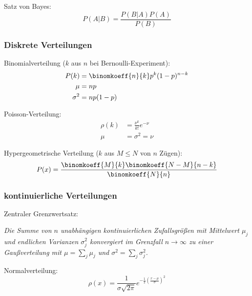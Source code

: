 \documentclass[11pt]{article}
\numberwithin{equation}{section}
\begin{document}
        Satz von Bayes:
        \begin{equation}
          P(A|B) = \frac{P(B|A)P(A)}{P(B)}
        \end{equation}

      \subsubsection{Diskrete Verteilungen}
        Binomialverteilung ($k$ aus $n$ bei Bernoulli-Experiment):
        \begin{equation}
          \begin{aligned}
            P(k)&=\binomkoeff{n}{k}p^k(1-p)^{n-k} \\
            \mu &= np \\
            \sigma^2 &= np(1-p)
          \end{aligned}
        \end{equation}

        Poisson-Verteilung:
        \begin{equation}
          \begin{aligned}
            \rho(k) &= \frac{\nu^k}{k!} e^{-\nu} \\
            \mu &= \sigma^2 = \nu
          \end{aligned}
        \end{equation}

        Hypergeometrische Verteilung ($k$ aus $M\le N$ von $n$ Zügen):
        \begin{equation}
          P(x)=\frac{\binomkoeff{M}{k}\binomkoeff{N-M}{n-k}}{\binomkoeff{N}{n}}
        \end{equation}

      \subsubsection{kontinuierliche Verteilungen}
        Zentraler Grenzwertsatz: \par
        \emph{Die Summe von $n$ unabhängigen kontinuierlichen Zufallsgrößen mit Mittelwert $\mu_j$ und endlichen Varianzen $\sigma_j^2$ konvergiert im Grenzfall $n\rightarrow \infty$ zu einer Gaußverteilung mit $\mu = \sum_j \mu_j$ und $\sigma^2 = \sum_j \sigma_j^2$.} \vsp

        Normalverteilung:
  			\begin{equation}
  				\rho(x)=\frac{1}{\sigma\sqrt{2\pi}}e^{-\frac{1}{2}\left(\frac{x-\mu}{\sigma}\right)^2}
  			\end{equation}
\end{document}
